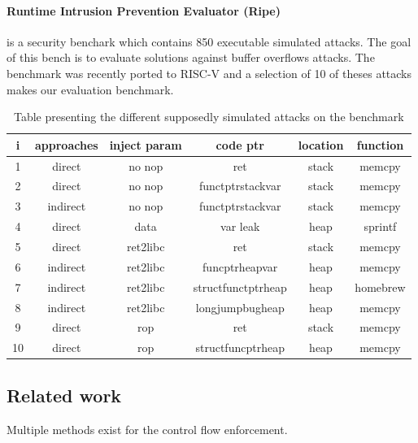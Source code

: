 \documentclass[9pt]{article}
\begin{document}
\begin{multicols}{2}
\paragraph{Runtime Intrusion Prevention Evaluator (Ripe) \cite{ripe_attack}} is a security benchark which contains 850 executable simulated attacks. The goal of this bench is to evaluate solutions against buffer overflows attacks. The benchmark was recently ported to RISC-V and a selection of 10 of theses attacks makes our evaluation benchmark.


\begin{table}
\centering
    \centering
    \tiny
    \begin{tabular}{c||c|c|c|c|c}
         i & approaches & inject param & code ptr & location & function \\ \hline \hline
         1 & direct & no nop & ret  & stack & memcpy\\\hline
         2 & direct & no nop & functptrstackvar & stack & memcpy\\\hline
         3 & indirect & no nop & functptrstackvar & stack & memcpy\\\hline
         4 & direct & data & var leak & heap & sprintf\\\hline
         5 & direct & ret2libc& ret & stack & memcpy\\\hline
         6 & indirect & ret2libc & funcptrheapvar & heap & memcpy\\\hline
         7 & indirect & ret2libc & structfunctptrheap & heap & homebrew\\\hline
         8 & indirect & ret2libc & longjumpbugheap&heap&memcpy\\\hline
         9 & direct & rop & ret&stack&memcpy\\\hline
         10& direct & rop & structfuncptrheap&heap&memcpy\\
    \end{tabular}
     \makeatletter{}\makeatother
    \caption{Table presenting the different supposedly simulated attacks on the benchmark}
\end{table}

\subsection{Related work}
Multiple methods exist for the control flow enforcement. 


\end{multicols}
\end{document}
